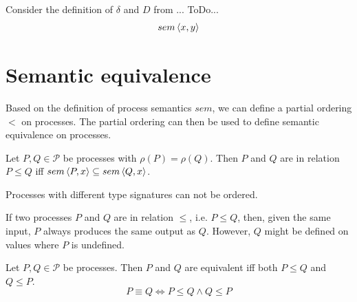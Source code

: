 \begin{example}
\label{exp:sem_repetition}
Consider the definition of $\delta$ and $D$ from  ... ToDo...
  \begin{eqnarray*}
    sem \left\langle x, y \right\rangle
  \end{eqnarray*}
  \hfill\qedsymbol
\end{example}


\section{Semantic equivalence}
Based on the definition of process semantics $sem$, we can define a partial ordering $<$ on processes. The partial ordering can then be used to define semantic equivalence on processes.



\begin{definition}
\label{def:process_ordering}
Let $P, Q \in \mathcal{P}$ be processes with $\rho \left( P \right) = \rho \left( Q \right)$. Then $P$ and $Q$ are in relation $P \leq Q$ iff $sem \left\langle P, x \right\rangle \subseteq sem \left\langle Q, x \right\rangle$.

Processes with different type signatures can not be ordered.

\hfill\qedsymbol
\end{definition}



If two processes $P$ and $Q$ are in relation $\leq$, i.e. $P \leq Q$, then, given the same input, $P$ always produces the same output as $Q$. However, $Q$ might be defined on values where $P$ is undefined.

\begin{definition}
\label{def:process_equivalence}
Let $P, Q \in \mathcal{P}$ be processes. Then $P$ and $Q$ are equivalent iff both $P \leq Q$ and $Q \leq P$.
  \begin{equation}
    \label{eqn:equivalence}
    P \equiv Q \Leftrightarrow P \leq Q \wedge Q \leq P
  \end{equation}
  \hfill\qedsymbol
\end{definition}

